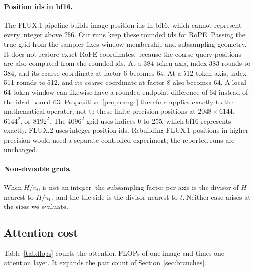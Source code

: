 \paragraph{Position ids in bf16.} The FLUX.1 pipeline builds image position ids in bf16, which cannot represent every integer above 256. Our runs keep these rounded ids for RoPE. Passing the true grid from the sampler fixes window membership and subsampling geometry. It does not restore exact RoPE coordinates, because the coarse-query positions are also computed from the rounded ids. At a 384-token axis, index 383 rounds to 384, and its coarse coordinate at factor 6 becomes 64. At a 512-token axis, index 511 rounds to 512, and its coarse coordinate at factor 8 also becomes 64. A local 64-token window can likewise have a rounded endpoint difference of 64 instead of the ideal bound 63. Proposition~\ref{prop:range} therefore applies exactly to the mathematical operator, not to these finite-precision positions at $2048\times6144$, $6144^2$, or $8192^2$. The $4096^2$ grid uses indices 0 to 255, which bf16 represents exactly. FLUX.2 uses integer position ids. Rebuilding FLUX.1 positions in higher precision would need a separate controlled experiment; the reported runs are unchanged.

\paragraph{Non-divisible grids.} When $H/n_0$ is not an integer, the subsampling factor per axis is the divisor of $H$ nearest to $H/n_0$, and the tile side is the divisor nearest to $t$. Neither case arises at the sizes we evaluate.

\subsection{Attention cost}
\label{app:cost}

Table~\ref{tab:flops} counts the attention FLOPs of one image and times one attention layer. It expands the pair count of Section~\ref{sec:branches}.

